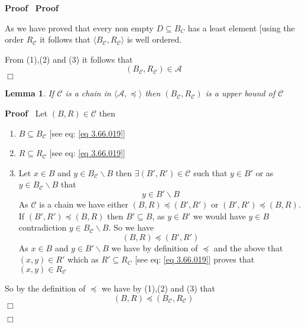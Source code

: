 \documentclass{book}
\newenvironment{proof}{\noindent\textbf{Proof\ }}{\hspace*{\fill}$\Box$\medskip}
\newtheorem{lemma}{Lemma}
\begin{document}
\begin{proof}
\begin{proof}
\begin{enumerate}
      As we have proved that every non empty $D \subseteq B_C$ has a least
      element [using the order $R_{\mathcal{C}}$ it follows that $\langle
      B_{\mathcal{C}}, R_{\mathcal{C}} \rangle$ is well ordered.
    \end{enumerate}
    From (1),(2) and (3) it follows that
    \[ (B_{\mathcal{C}}, R_{\mathcal{C}}) \in \mathcal{A} \]
  \end{proof}
  
  \begin{lemma}
    \label{choice lemma upper bound of chain}If $\mathcal{C}$ is a chain in
    $\langle \mathcal{A}, \preccurlyeq \rangle$ then $(B_{\mathcal{C}},
    R_{\mathcal{C}})$ is a upper bound of $\mathcal{C}$
  \end{lemma}
  
  \begin{proof}
    Let $(B, R) \in \mathcal{C}$ then
    \begin{enumerate}
      \item $B \subseteq B_{\mathcal{C}}$ [see eq: \ref{eq 3.66.019}]
      
      \item $R \subseteq R_{\mathcal{C}}$ [see eq: \ref{eq 3.66.019}]
      
      \item Let $x \in B$ and $y \in B_{\mathcal{C}} \backslash B$ then
      $\exists (B', R') \in \mathcal{C}$ such that $y \in B'$ or as $y \in
      B_{\mathcal{C}} \backslash B$ that
      \[ y \in B' \backslash B \]
      As $\mathcal{C}$ is a chain we have either $(B, R) \preccurlyeq (B',
      R')$ or $(B', R') \preccurlyeq (B, R)$. If $(B', R') \preccurlyeq (B,
      R)$ then $B' \subseteq B$, as $y \in B'$ we would have $y \in B$
      contradiction $y \in B_{\mathcal{C}} \backslash B$. So we have
      \[ (B, R) \preccurlyeq (B', R') \]
      As $x \in B$ and $y \in B' \backslash B$ we have by definition of
      $\preccurlyeq$ and the above that $(x, y) \in R'$ which as $R' \subseteq
      R_C$ [see eq: \ref{eq 3.66.019}] proves that $(x, y) \in
      R_{\mathcal{C}}$
    \end{enumerate}
    So by the definition of $\preccurlyeq$ we have by (1),(2) and (3) that
    \[ (B, R) \preccurlyeq (B_{\mathcal{C}}, R_{\mathcal{C}}) \]
  \end{proof}
  

\end{proof}
\end{document}
